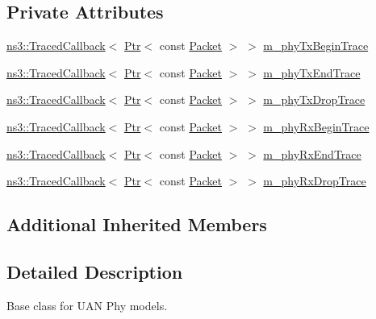 \subsection*{Private Attributes}
\begin{DoxyCompactItemize}
\item 
\hyperlink{classns3_1_1TracedCallback}{ns3\+::\+Traced\+Callback}$<$ \hyperlink{classns3_1_1Ptr}{Ptr}$<$ const \hyperlink{classns3_1_1Packet}{Packet} $>$ $>$ \hyperlink{classns3_1_1UanPhy_ab6c9ef4e39580603d38b957061e0dd93}{m\+\_\+phy\+Tx\+Begin\+Trace}
\item 
\hyperlink{classns3_1_1TracedCallback}{ns3\+::\+Traced\+Callback}$<$ \hyperlink{classns3_1_1Ptr}{Ptr}$<$ const \hyperlink{classns3_1_1Packet}{Packet} $>$ $>$ \hyperlink{classns3_1_1UanPhy_a8cc06e8706afacf7b9021df62599e560}{m\+\_\+phy\+Tx\+End\+Trace}
\item 
\hyperlink{classns3_1_1TracedCallback}{ns3\+::\+Traced\+Callback}$<$ \hyperlink{classns3_1_1Ptr}{Ptr}$<$ const \hyperlink{classns3_1_1Packet}{Packet} $>$ $>$ \hyperlink{classns3_1_1UanPhy_a5fae11ade758fd7e20b21d90faadc959}{m\+\_\+phy\+Tx\+Drop\+Trace}
\item 
\hyperlink{classns3_1_1TracedCallback}{ns3\+::\+Traced\+Callback}$<$ \hyperlink{classns3_1_1Ptr}{Ptr}$<$ const \hyperlink{classns3_1_1Packet}{Packet} $>$ $>$ \hyperlink{classns3_1_1UanPhy_a44e0cd67ddc48a376c620472ec5b1484}{m\+\_\+phy\+Rx\+Begin\+Trace}
\item 
\hyperlink{classns3_1_1TracedCallback}{ns3\+::\+Traced\+Callback}$<$ \hyperlink{classns3_1_1Ptr}{Ptr}$<$ const \hyperlink{classns3_1_1Packet}{Packet} $>$ $>$ \hyperlink{classns3_1_1UanPhy_a6bbe64c9f06cc631da4824066eb79e16}{m\+\_\+phy\+Rx\+End\+Trace}
\item 
\hyperlink{classns3_1_1TracedCallback}{ns3\+::\+Traced\+Callback}$<$ \hyperlink{classns3_1_1Ptr}{Ptr}$<$ const \hyperlink{classns3_1_1Packet}{Packet} $>$ $>$ \hyperlink{classns3_1_1UanPhy_a699b0b031b26c32c1a8df988ea20ec26}{m\+\_\+phy\+Rx\+Drop\+Trace}
\end{DoxyCompactItemize}
\subsection*{Additional Inherited Members}


\subsection{Detailed Description}
Base class for U\+AN Phy models. 

